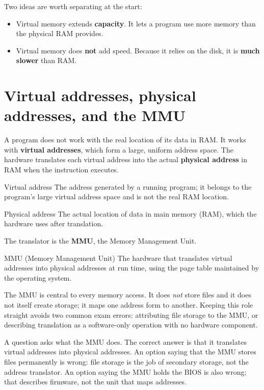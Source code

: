 Two ideas are worth separating at the start:
\begin{itemize}
  \item Virtual memory extends \textbf{capacity}. It lets a program use more
    memory than the physical RAM provides.
  \item Virtual memory does \textbf{not} add speed. Because it relies on the
    disk, it is \textbf{much slower} than RAM.
\end{itemize}

\section{Virtual addresses, physical addresses, and the MMU}
A program does not work with the real location of its data in RAM. It works
with \textbf{virtual addresses}, which form a large, uniform address space.
The hardware translates each virtual address into the actual \textbf{physical
address} in RAM when the instruction executes.

\begin{definitionbox}{Virtual address}
The address generated by a running program; it belongs to the program's large
virtual address space and is not the real RAM location.
\end{definitionbox}

\begin{definitionbox}{Physical address}
The actual location of data in main memory (RAM), which the hardware uses after
translation.
\end{definitionbox}

The translator is the \textbf{MMU}, the Memory Management Unit.

\begin{definitionbox}{MMU (Memory Management Unit)}
The hardware that translates virtual addresses into physical addresses at run
time, using the page table maintained by the operating system.
\end{definitionbox}

The MMU is central to every memory access. It does \emph{not} store files and it
does not itself create storage; it maps one address form to another. Keeping
this role straight avoids two common exam errors: attributing file storage to
the MMU, or describing translation as a software-only operation with no
hardware component.

\begin{example}
A question asks what the MMU does. The correct answer is that it translates
virtual addresses into physical addresses. An option saying that the MMU stores
files permanently is wrong: file storage is the job of secondary storage, not
the address translator. An option saying the MMU holds the BIOS is also wrong;
that describes firmware, not the unit that maps addresses.
\end{example}

